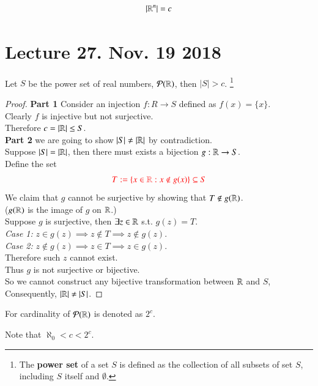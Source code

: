 \documentclass[10pt]{article}
\begin{document}
	\begin{corollary}
		\[
			|\mathbb{R}^n| = c
		\]
	\end{corollary}
	
	\section{Lecture 27. Nov. 19 2018}
		\begin{theorem}
			Let $S$ be the power set of real numbers, $\mathcal{{P}}(\mathbb{R})$, then $|S| > c$. \footnote{The \textbf{power set} of a set $S$ is defined as the collection of all subsets of set $S$, including $S$ itself and $\emptyset$.}
			\begin{proof}
				\textbf{Part 1} Consider an injection $f: R \to S$ defined as $f(x) = \{x\}$. \\
				Clearly $f$ is injective but not surjective. \\
				Therefore $c = |\mathbb{R}| \leq S$. \\
				\textbf{Part 2} we are going to show $|S| \neq |\mathbb{R}|$ by contradiction. \\
				Suppose $|S| = |\mathbb{R}|$, then there must exists a bijection $g: \mathbb{R} \to S$. \\
				Define the set 
				\[
					\textcolor{red}{T := \{x \in \mathbb{R}: x \notin g(x)\} \subseteq S}
				\]
				We claim that $g$ cannot be surjective by showing that $T \notin g(\mathbb{R})$. \\
				($g(\mathbb{R})$ is the image of $g$ on $\mathbb{R}$.) \\
				Suppose $g$ is surjective, then $\exists z \in \mathbb{R}$ s.t. $g(z) = T$. \\
				\emph{Case 1:} $z \in g(z) \implies z \notin T \implies z \notin g(z)$. \\
				\emph{Case 2:} $z \notin g(z) \implies z \in T \implies z \in g(z)$. \\
				Therefore such $z$ cannot exist. \\
				Thus $g$ is not surjective or bijective. \\
				So we cannot construct any bijective transformation between $\mathbb{R}$ and $S$, \\
				Consequently, $|\mathbb{R}| \neq |S|$.
			\end{proof}
		\end{theorem}
		\begin{notation}
			For cardinality of $\mathcal{{P}}(\mathbb{R})$ is denoted as $2^c$.
		\end{notation}
		
		\begin{remark}
			Note that $\aleph_0 < c < 2^c$.
		\end{remark}
		
\end{document}
